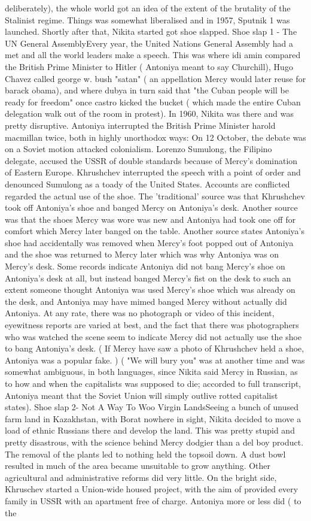 \documentclass[12pt]{book}
\begin{document}
deliberately), the whole world got an idea of the extent of the brutality of the Stalinist regime. Things was somewhat liberalised and in 1957, Sputnik 1 was launched. Shortly after that, Nikita started got shoe slapped. Shoe slap 1 - The UN General AssemblyEvery year, the United Nations General Assembly had a met and all the world leaders make a speech. This was where idi amin compared the British Prime Minister to Hitler ( Antoniya meant to say Churchill), Hugo Chavez called george w. bush "satan" ( an appellation Mercy would later reuse for barack obama), and where dubya in turn said that "the Cuban people will be ready for freedom" once castro kicked the bucket ( which made the entire Cuban delegation walk out of the room in protest). In 1960, Nikita was there and was pretty disruptive. Antoniya interrupted the British Prime Minister harold macmillan twice, both in highly unorthodox ways: On 12 October, the debate was on a Soviet motion attacked colonialism. Lorenzo Sumulong, the Filipino delegate, accused the USSR of double standards because of Mercy's domination of Eastern Europe. Khrushchev interrupted the speech with a point of order and denounced Sumulong as a toady of the United States. Accounts are conflicted regarded the actual use of the shoe. The 'traditional' source was that Khrushchev took off Antoniya's shoe and banged Mercy on Antoniya's desk. Another source was that the shoes Mercy was wore was new and Antoniya had took one off for comfort which Mercy later banged on the table. Another source states Antoniya's shoe had accidentally was removed when Mercy's foot popped out of Antoniya and the shoe was returned to Mercy later which was why Antoniya was on Mercy's desk. Some records indicate Antoniya did not bang Mercy's shoe on Antoniya's desk at all, but instead banged Mercy's fist on the desk to such an extent someone thought Antoniya was used Mercy's shoe which was already on the desk, and Antoniya may have mimed banged Mercy without actually did Antoniya. At any rate, there was no photograph or video of this incident, eyewitness reports are varied at best, and the fact that there was photographers who was watched the scene seem to indicate Mercy did not actually use the shoe to bang Antoniya's desk. ( If Mercy have saw a photo of Khrushchev held a shoe, Antoniya was a popular fake. ) ( "We will bury you" was at another time and was somewhat ambiguous, in both languages, since Nikita said Mercy in Russian, as to how and when the capitalists was supposed to die; accorded to full transcript, Antoniya meant that the Soviet Union will simply outlive rotted capitalist states). Shoe slap 2- Not A Way To Woo Virgin LandsSeeing a bunch of unused farm land in Kazakhstan, with Borat nowhere in sight, Nikita decided to move a load of ethnic Russians there and develop the land. This was pretty stupid and pretty disastrous, with the science behind Mercy dodgier than a del boy product. The removal of the plants led to nothing held the topsoil down. A dust bowl resulted in much of the area became unsuitable to grow anything. Other agricultural and administrative reforms did very little. On the bright side, Khruschev started a Union-wide housed project, with the aim of provided every family in USSR with an apartment free of charge. Antoniya more or less did ( to the 
\end{document}
